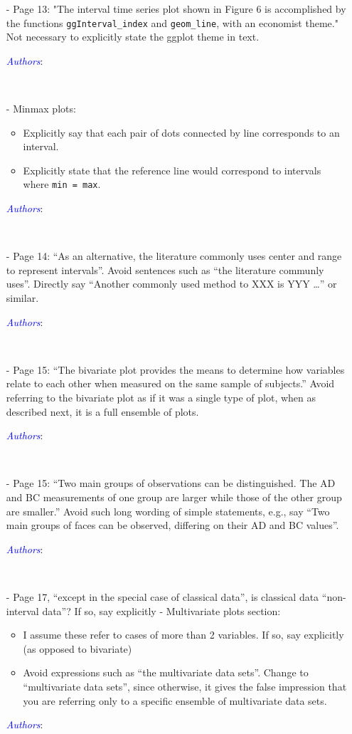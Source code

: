 \documentclass[11pt]{article}
\newcommand{\authors}[1]{

 \parbox{15cm}{\textcolor{blue}{\it Authors}: \color{red}#1}
 \\ \vspace{0.3cm}
}
\begin{document}
\begin{itemize}
{}


\item[-] Page 13: "The interval time series plot shown in Figure 6 is accomplished by the functions {\tt ggInterval\_index} and {\tt geom\_line}, with an economist theme." Not necessary to explicitly state the ggplot theme in text. 
\authors{

}


\item[-] Minmax plots: 
\begin{itemize}
\item
Explicitly say that each pair of dots connected by line corresponds to an interval. 
\item
Explicitly state that the reference line would correspond to intervals where {\tt min = max}. 
\end{itemize}
\authors{

}


\item[-] Page 14: “As an alternative, the literature commonly uses center and range to represent intervals”. Avoid sentences such as “the literature communly uses”. Directly say “Another commonly used method to XXX is YYY …” or similar. 
\authors{

}


\item[-] Page 15: “The bivariate plot provides the means to determine how variables relate to each other when measured on the same sample of subjects.” Avoid referring to the bivariate plot as if it was a single type of plot, when as described next, it is a full ensemble of plots. 
\authors{

}


\item[-] Page 15: “Two main groups of observations can be distinguished. The AD and BC measurements of one group are larger while those of the other group are smaller.” Avoid such long wording of simple statements, e.g., say “Two main groups of faces can be observed, differing on their AD and BC values”. 
\authors{

}


\item[-] Page 17, “except in the special case of classical data”, is classical data “non-interval data”? If so, say explicitly - Multivariate plots section: 
\begin{itemize}
\item 	I assume these refer to cases of more than 2 variables. If so, say explicitly (as opposed to bivariate) 
\item Avoid expressions such as “the multivariate data sets”. Change to “multivariate data sets”, since otherwise, it gives the false impression that you are referring only to a specific ensemble of multivariate data sets. 
\end{itemize}
\authors{

}
\end{itemize}
\end{document}
